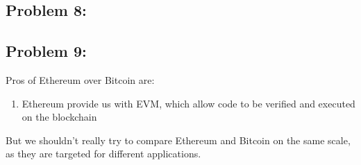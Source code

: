 \documentclass[a4paper]{article}
\begin{document}
\subsection*{Problem 8:}



\subsection*{Problem 9:}

Pros of Ethereum over Bitcoin are:
\begin{enumerate}
    \item Ethereum provide us with EVM, which allow code to be verified and executed on the blockchain
\end{enumerate}

But we shouldn't really try to compare Ethereum and Bitcoin on the same scale,
as they are targeted for different applications.
\end{document}
